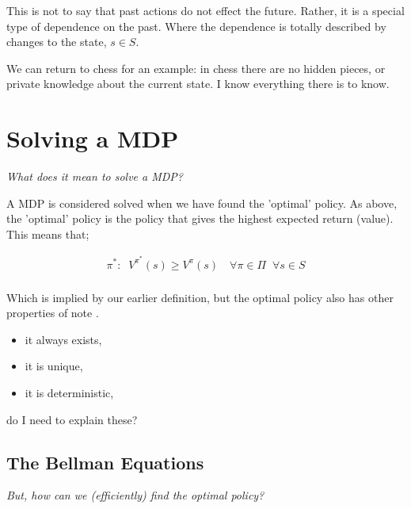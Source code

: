 
This is not to say that past actions do not effect the future. Rather,
it is a special type of dependence on the past. Where the dependence is
totally described by changes to the state, $s\in S$.

We can return to chess for an example: in chess there are no hidden pieces, or
private knowledge about the current state. I know everything there is to know.


\section{Solving a MDP}

\begin{displayquote}
  \textsl{What does it mean to solve a MDP?}
\end{displayquote}

A MDP is considered solved when we have found the 'optimal' policy. As above,
the 'optimal' policy is the policy that gives the highest expected return (value).
This means that;

\begin{align*}
\pi^{*} : \;\; V^{\pi^* }(s) \ge V^{\pi}(s) \quad \forall \pi\in \Pi \;\;\forall s\in S\\
\end{align*}

Which is implied by our earlier definition, but the optimal policy also has other properties of note \cite{Bertsekas1996, Putterman2015}.

\begin{itemize}
\tightlist
  \item it always exists,
  \item it is unique,
  \item it is deterministic,
\end{itemize}

{\color{red}do I need to explain these?}

\subsection{The Bellman Equations}

\begin{displayquote}
  \textsl{But, how can we (efficiently) find the optimal policy?}
\end{displayquote}

